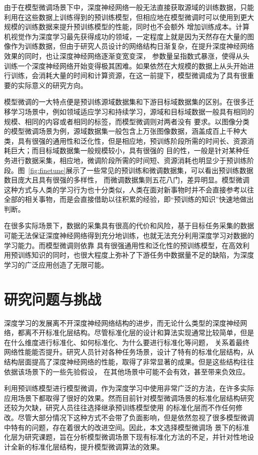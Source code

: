 由于在模型微调场景下中，深度神经网络一般无法直接获取源域的训练数据，只能利用在这些数据上训练得到的预训练模型，但相应地在模型微调时可以使用到更大规模的训练数据来提升预训练模型的性能，同时也不会额外
增加训练成本。计算机视觉作为深度学习最先获得成功的领域，一定程度上就是因为天然存在大量的图像作为训练数据，但由于研究人员设计的网络结构日渐复杂，在提升深度神经网络效果的同时，也让深度神经网络逐渐变宽变深，
参数量呈指数式暴涨，使得从头训练一个深度神经网络开始变得极其困难。如果依然在大规模的数据上从头开始进行训练，会消耗大量的时间和计算资源，在这一前提下，模型微调成为了具有很重要的实际意义的研究方向。

模型微调的一大特点便是预训练源域数据集和下游目标域数据集的区别。在很多迁移学习场景中，例如领域适应学习和持续学习，源域和目标域数据一般具有相同的规模、相同的内容或者相同的标签，而模型微调则对两者没有
要求。以图像分类的模型微调场景为例，源域数据集一般包含上万张图像数据，涵盖成百上千种大类，具有很强的通用性和泛化性，但是相应地，预训练阶段所需的时间长、资源消耗巨大；而目标域数据集一般规模较小，具有很强的
目的性，一般是针对某种任务进行数据采集，相应地，微调阶段所需的时间短、资源消耗也明显少于预训练阶段。图~\ref{fig:finetune}展示了一些常见的预训练和微调数据集，可以看出预训练数据数目庞大且具有很强的多样性，
而微调数据集则五花八门，差异明显。模型微调这种方式与人类的学习行为也十分类似，人类在面对新事物时并不会直接参考以往全部的相关事物，而是会直接借助以往积累的经验，即“预训练的知识”快速地做出判断。

在很多实际场景下，数据的采集具有很高的代价和风险，基于目标任务采集的数据可能无法保证深度神经网络得到充分地训练，也就无法充分利用深度学习对数据的学习能力。而模型微调则依靠
具有很强通用性和泛化性的预训练模型，在高效利用预训练知识的同时，也很大程度上弥补了下游任务中数据量不足的缺陷，为深度学习的广泛应用创造了无限可能。

\section{研究问题与挑战}

深度学习的发展离不开深度神经网络结构的进步，而无论什么类型的深度神经网络，都离不开标准化层结构。尽管标准化层的设计和算法实现通常比较简单，但是在什么维度进行标准化、如何标准化、为什么要进行标准化等问题，
关系着最终网络性能能否提升。研究人员针对各种任务场景，设计了特有的标准化层结构，从结构层面提高了深度神经网络的性能，取得了非常显著的成果。但是这些结构往往依据该场景下的一些先验假设，
在其他场景中可能不会有效，甚至带来负效应。

利用预训练模型进行模型微调，作为深度学习中使用非常广泛的方法，在许多实际应用场景下都取得了很好的效果。然而目前针对模型微调场景的标准化层结构研究还较为欠缺，研究人员往往选择继承预训练模型使用
的标准化层而不作任何修改。尽管大部分情况下这种方式不会带了负面影响，但是依然忽视了很多模型微调中特有的问题，存在着很大的改进空间。因此，本文选择模型微调场
景下的标准化层为研究课题，旨在分析模型微调场景下现有标准化方法的不足，并针对性地设计全新的标准化层结构，提升模型微调算法的效果。


